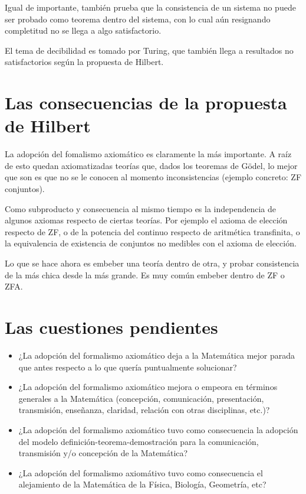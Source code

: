 \documentclass[a4paper,11pt]{article}
\begin{document}
Igual de importante, también prueba que la consistencia de un sistema no puede ser probado como teorema dentro del sistema, con lo cual aún resignando completitud no se llega a algo satisfactorio.

El tema de decibilidad es tomado por Turing, que también llega a resultados no satisfactorios según la propuesta de Hilbert.

\section{Las consecuencias de la propuesta de Hilbert}
La adopción del fomalismo axiomático es claramente la más importante. A raíz de esto quedan axiomatizadas teorías que, dados los teoremas de Gödel, lo mejor que son es que no se le conocen al momento inconsistencias (ejemplo concreto: ZF conjuntos).

Como subproducto y consecuencia al mismo tiempo es la independencia de algunos axiomas respecto de ciertas teorías. Por ejemplo el axioma de elección respecto de ZF, o de la potencia del continuo respecto de aritmética transfinita, o la equivalencia de existencia de conjuntos no medibles con el axioma de elección.

Lo que se hace ahora es embeber una teoría dentro de otra, y probar consistencia de la más chica desde la más grande. Es muy común embeber dentro de ZF o ZFA.


\section{Las cuestiones pendientes}
\begin{itemize}
	\item ¿La adopción del formalismo axiomático deja a la Matemática mejor parada que antes respecto a lo que quería puntualmente solucionar?
	\item ¿La adopción del formalismo axiomático mejora o empeora en términos generales a la Matemática (concepción, comunicación, presentación, transmisión, enseñanza, claridad, relación con otras disciplinas, etc.)?
	\item ¿La adopción del formalismo axiomático tuvo como consecuencia la adopción del modelo definición-teorema-demostración para la comunicación, transmisión y/o concepción de la Matemática?
	\item ¿La adopción del formalismo axiomátivo tuvo como consecuencia el alejamiento de la Matemática de la Física, Biología, Geometría, etc?
\end{itemize}
\end{document}
